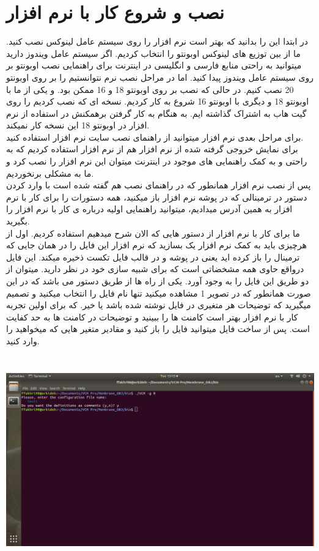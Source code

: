 \documentclass[12pt,onecolumn,a4paper]{report}
\begin{document}
\section{\LARGE{نصب و شروع کار با نرم افزار}}
\large{در ابتدا این را بدانید که بهتر است نرم افزار را روی سیستم عامل لینوکس نصب کنید. ما از بین توزیع های لینوکس اوبونتو را انتخاب کردیم. اگر سیستم عامل ویندوز دارید میتوانید به راحتی منابع فارسی و انگلیسی در اینترنت برای راهنمایی نصب اوبونتو بر روی سیستم عامل ویندوز پیدا کنید. اما در مراحل نصب نرم  نتوانستیم  را بر روی اوبونتو 20 نصب کنیم. در حالی که نصب  بر روی اوبونتو 18 و 16 ممکن بود. و یکی از ما با اوبونتو 18 و دیگری با اوبونتو 16 شروع به کار کردیم. نسخه  ای که نصب کردیم را روی گیت هاب به اشتراک گذاشته ایم. به هنگام به کار گرفتن برهمکنش در استفاده از نرم افزار  در اوبونتو 18 این نسخه  کار نمیکند. \\
برای مراحل بعدی نرم افزار میتوانید از راهنمای نصب سایت نرم افزار استفاده کنید.\\
برای نمایش خروجی گرفته شده از نرم افزار  هم از نرم افزار  استفاده کردیم که به راحتی و به کمک راهنمایی های موجود در اینترنت میتوان این نرم افزار را نصب کرد و ما به مشکلی برنخوردیم.\\
پس از نصب نرم افزار همانطور که در راهنمای نصب هم گفته شده است با وارد کردن دستور   در ترمینالی که در پوشه   نرم افزار باز میکنید، همه دستورات را برای کار با نرم افزار به همین آدرس میدادیم، میتوانید راهنمایی اولیه درباره ی کار با نرم افزار را بگیرید.\\
ما برای کار با نرم افزار از دستور هایی که الان شرح میدهیم استفاده کردیم. اول از هرچیزی باید به کمک نرم افزار یک   بسازید که نرم افزار این فایل را در همان جایی که ترمینال را باز کرده اید یعنی در پوشه   و در قالب فایل تکست ذخیره میکند. این فایل درواقع حاوی همه مشخضاتی است که برای شبیه سازی خود در نظر دارید. میتوان از دو طریق این فایل را به وجود آورد. یکی از راه ها از طریق دستور   می باشد که در این صورت همانطور که در تصویر 1 مشاهده میکنید تنها نام فایل را انتخاب میکنید و تصمیم میگیرید که توضیحات هر متغیری در فایل نوشته شده باشد یا خیر. که برای اولین تجربه کار با نرم افزار بهتر است کامنت ها را ببینید و توضیحات در کامنت ها به حد کفایت است. پس از ساخت فایل میتوانید فایل را باز کنید و مقادیر متغیر هایی که میخواهید را وارد کنید.\\
\begin{center}
\includegraphics[width=16cm, height=9cm]{01.png}

\end{center}}
\end{document}
